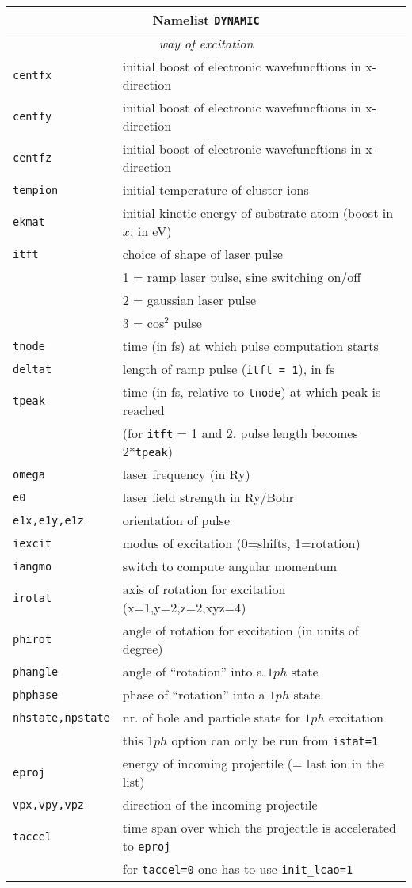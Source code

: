 \documentclass[12pt]{article}
\begin{document}
\begin{tabular}{ll}
\hline
\multicolumn{2}{c}{Namelist {\tt DYNAMIC}} in {\tt for005.<name>} \\
\hline
\multicolumn{2}{c}{\it way of excitation} \\
\hline
{\tt centfx           }& initial boost of electronic wavefuncftions in x-direction\\
{\tt centfy           }& initial boost of electronic wavefuncftions in x-direction\\
{\tt centfz           }& initial boost of electronic wavefuncftions in x-direction\\
{\tt tempion          }& initial temperature of cluster ions \\
{\tt ekmat} & initial kinetic energy of substrate atom (boost in $x$, in eV)\\
{\tt itft   }& choice of shape of laser pulse \\
&   1 = ramp laser pulse, sine switching on/off\\
&   2 = gaussian laser pulse \\
&   3 = cos$^2$ pulse\\
{\tt tnode  }& time (in fs) at which pulse computation starts\\
{\tt deltat }& length of ramp pulse ({\tt itft = 1}), in fs\\
{\tt tpeak  }& time (in fs, relative to {\tt tnode}) at which peak is reached\\
& (for {\tt itft} = 1 and 2, pulse length becomes 2*{\tt tpeak})\\
{\tt omega  }& laser frequency (in Ry)\\
{\tt e0     }& laser field strength in Ry/Bohr\\
{\tt e1x,e1y,e1z   }& orientation of pulse\\
{\tt iexcit} & modus of excitation (0=shifts, 1=rotation)\\
{\tt iangmo} & switch to compute angular momentum\\
{\tt irotat} & axis of rotation for excitation (x=1,y=2,z=2,xyz=4)\\
{\tt phirot} & angle of rotation for excitation (in units of degree)\\
{\tt phangle}        & angle of ``rotation'' into a $1ph$ state\\
{\tt phphase}        & phase of ``rotation'' into a $1ph$ state\\
{\tt nhstate,npstate}& nr. of hole and particle state for $1ph$
                      excitation\\
                     & this $1ph$ option can only be run from {\tt istat=1}
\\
{\tt eproj}& energy of incoming projectile (= last ion in the list)
\\
{\tt vpx,vpy,vpz}& direction of the incoming projectile
\\
{\tt taccel}& time span over which the projectile is accelerated to
             {\tt eproj}
\\
& for {\tt taccel=0} one has to use {\tt init\_lcao=1}
\\
\hline
\end{tabular}
\end{document}
